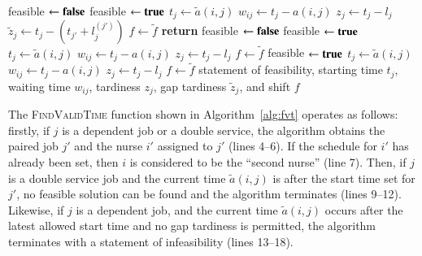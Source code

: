 \documentclass[a4paper,11pt,authoryear]{elsarticle}
\begin{document}
\begin{algorithm}[htbp!]
\begin{algorithmic}[1]
				\Return feasible $\gets \textbf{false}$
						\Continue
					\Else
						\State feasible $\gets \textbf{true}$
						\State $t_j \gets \tilde{a}(i,j)$
						\State $w_{ij} \gets t_j - a(i,j)$
						\State $z_j \gets t_j - l_j$
						\State $\tilde{z}_j \gets t_j - (t_{j'} + l_j^{(j')})$
						\State $f \gets \tilde{f}$
					\EndIf
				\Else \hspace{0.2mm} \textbf{return} feasible $\gets \textbf{false}$ %
				\EndIf
				\Continue
			\Else
				\State feasible $\gets \textbf{true}$
				\State $t_j \gets \tilde{a}(i,j)$
				\State $w_{ij} \gets t_j - a(i,j)$
				\State $z_j \gets t_j - l_j$
				\State $f \gets \tilde{f}$
			\EndIf
				\Continue
			\Else
				\State feasible $\gets \textbf{true}$
				\State $t_j \gets \tilde{a}(i,j)$
				\State $w_{ij} \gets t_j - a(i,j)$
				\State $z_j \gets t_j - l_j$
				\State $f \gets \tilde{f}$
			\EndIf
		\EndIf
	\EndWhile
	\Return statement of feasibility, starting time $t_j$, waiting time $w_{ij}$, tardiness $z_j$, gap tardiness $\tilde{z}_j$, and shift $f$
\end{algorithmic}
\end{algorithm}

The \textsc{FindValidTime} function shown in Algorithm~\ref{alg:fvt} operates as follows: firstly, if $j$ is a dependent job or a double service, the algorithm obtains the paired job $j'$ and the nurse $i'$ assigned to $j'$ (lines 4--6). If the schedule for $i'$ has already been set, then $i$ is considered to be the ``second nurse'' (line 7). Then, if $j$ is a double service job and the current time $\tilde{a}(i,j)$ is after the start time set for $j'$, no feasible solution can be found and the algorithm terminates (lines 9--12). Likewise, if $j$ is a dependent job, and the current time $\tilde{a}(i,j)$ occurs after the latest allowed start time and no gap tardiness is permitted, the algorithm terminates with a statement of infeasibility (lines 13--18).
\end{document}
